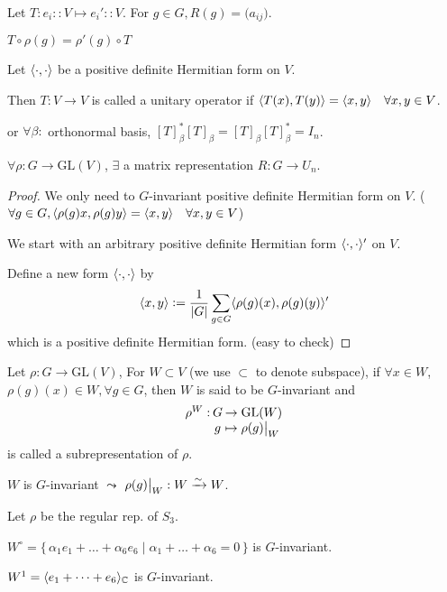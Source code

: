 Let $T: e_i :: V \mapsto e_i' :: V$. For $g \in G, R(g) = \big(a_{ij}\big)$.

$T \circ \rho(g) = \rho'(g) \circ T$

\begin{definition}
  Let $\langle\cdot, \cdot\rangle$ be a positive definite Hermitian form on $V$.

  Then $T: V \to V$ is called a unitary operator if
  $\langle T(x), T(y)\rangle = \langle x, y\rangle \quad \forall x, y \in V$.

  or $\forall \beta:$ orthonormal basis,
  $[T]_\beta^*[T]_\beta = [T]_\beta[T]_\beta^* = I_n$.
\end{definition}

\begin{theorem}
  $\forall \rho: G \to \text{GL}(V)$, $\exists$ a matrix representation
  $R: G \to U_n$.
  \begin{proof}
    We only need to $G$-invariant positive definite Hermitian form on $V$.
    ($\forall g \in G, \langle\rho(g)x, \rho(g)y\rangle = \langle x, y\rangle \quad
  \forall x, y \in V$)

  We start with an arbitrary positive definite Hermitian form
  $\langle\cdot, \cdot\rangle'$ on $V$.

  Define a new form $\langle\cdot, \cdot\rangle$ by
  \[
    \langle x, y\rangle \vcentcolon= \frac{1}{\lvert G\rvert} \sum_{g\in G}
    \langle\rho(g)(x), \rho(g)(y)\rangle'
  \]
  which is a positive definite Hermitian form. (easy to check)
  \end{proof}
\end{theorem}

\begin{definition}
  Let $\rho: G \to \text{GL}(V)$, For $W \subset V$ (we use $\subset$ to denote
  subspace), if $\forall x \in W$, $\rho(g)(x) \in W, \forall g \in G$, then
  $W$ is said to be $G$-invariant and
  \[
    \arraycolsep=1pt
    \begin{array}{rcl}
      \rho^W: & G & \to \text{GL}(W) \\
              & g & \mapsto \rho(g) \big|_W
    \end{array}
  \]
  is called a subrepresentation of $\rho$.
\end{definition}

$W$ is $G$-invariant $\leadsto$ $\rho(g) \big|_W: W \xrightarrow{\sim} W$.

\begin{example}
  Let $\rho$ be the regular rep. of $S_3$.

  $W^\circ = \{\, \alpha_1e_1 + \dots + \alpha_6e_6 \mid \alpha_1 +\dots + \alpha_6 = 0 \,\}$
  is $G$-invariant.

  $W^1 = \langle e_1 + \dots + e_6\rangle_{\mathbb{C}}$ is $G$-invariant.
\end{example}

